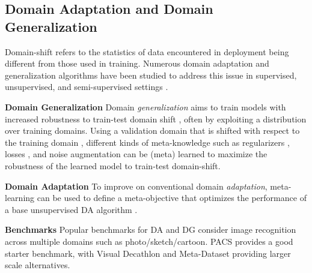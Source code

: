 \documentclass[10pt,journal,compsoc]{IEEEtran}
\newcommand{\cut}[1]{}
\newcommand{\keypoint}[1]{\vspace{0.1cm}\noindent\textbf{#1}\quad}
\begin{document}
\subsection{Domain Adaptation and Domain Generalization}
\label{subsec:domainshift}
Domain-shift refers to the
statistics of data encountered in deployment being different from those used in training. Numerous domain adaptation and generalization algorithms have been studied to address this issue in supervised, unsupervised, and semi-supervised settings \cite{csurka2017domainadaptationbook}.

\keypoint{Domain Generalization}
Domain \emph{generalization} aims to train models with increased robustness to train-test domain shift  \cite{muandet2013domain}, often by exploiting a distribution over training domains. Using a validation domain that is shifted with respect to the training domain \cite{li2017learntogeneralize}, different kinds of meta-knowledge such as regularizers \cite{balaji2018metareg}, losses \cite{li2019featurecritic}, and noise augmentation \cite{tseng2020crossdomain} can be (meta) learned to maximize the robustness of the learned model to train-test domain-shift.

\keypoint{Domain Adaptation}
To improve on conventional domain \emph{adaptation}\cite{csurka2017domainadaptationbook}, meta-learning can be used to define a meta-objective that optimizes the performance of a base unsupervised DA algorithm \cite{li2020metadomain}.

\keypoint{Benchmarks} Popular benchmarks for DA and DG consider image recognition across multiple domains such as photo/sketch/cartoon. \cut{Datasets with multiple domains are often used in order to provide a domain distribution for meta-learning.} PACS \cite{li2017dg} provides a good starter benchmark, with Visual Decathlon \cite{li2019featurecritic,rebuff2017mdl} and Meta-Dataset \cite{triantafillou2019metadataset} providing larger scale alternatives.
\end{document}
